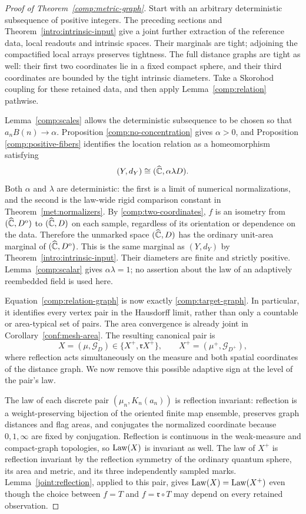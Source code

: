 \begin{proof}[Proof of Theorem~\ref{comp:metric-graph}]
Start with an arbitrary deterministic subsequence of positive
integers.  The preceding sections and
Theorem~\ref{intro:intrinsic-input} give a joint further extraction
of the reference data, local readouts and intrinsic spaces.
Their marginals are tight; adjoining the compactified local
arrays preserves tightness.  The full distance graphs are tight
as well: their first two coordinates lie in a fixed compact
sphere, and their third coordinates are bounded by the tight
intrinsic diameters.  Take a Skorohod coupling for these retained
data, and then apply Lemma~\ref{comp:relation} pathwise.

Lemma~\ref{comp:scales} allows the deterministic subsequence to
be chosen so that $a_nB(n)\to\alpha$.  Proposition
\ref{comp:no-concentration} gives $\alpha>0$, and Proposition
\ref{comp:positive-fibers} identifies the location relation as a
homeomorphism satisfying
\[
 (Y,d_Y)\cong(\widehat{\mathbb C},\alpha\lambda D).
\]
Both $\alpha$ and $\lambda$ are deterministic: the first is a
limit of numerical normalizations, and the second is the
law-wide rigid comparison constant in
Theorem~\ref{met:normalizers}.  By
\eqref{comp:two-coordinates}, $f$ is an isometry from
$(\widehat{\mathbb C},D^{\mathrm o})$ to $(\widehat{\mathbb C},D)$ on each sample, regardless
of its orientation or dependence on the data.  Therefore the
unmarked space $(\widehat{\mathbb C},D)$ has the ordinary unit-area marginal
of $(\widehat{\mathbb C},D^{\mathrm o})$.  This is the same marginal as
$(Y,d_Y)$ by Theorem~\ref{intro:intrinsic-input}.  Their diameters
are finite and strictly positive.  Lemma~\ref{comp:scalar}
gives $\alpha\lambda=1$; no assertion about the law of an
adaptively reembedded field is used here.

Equation~\eqref{comp:relation-graph} is now exactly
\eqref{comp:target-graph}.  In particular, it identifies every
vertex pair in the Hausdorff limit, rather than only a countable
or area-typical set of pairs.  The area convergence is already
joint in Corollary~\ref{conf:mesh-area}.  The resulting canonical
pair is
\[
 X=(\mu,\mathcal G_D)
   \in\{X^+,\mathfrak r X^+\},\qquad
 X^+=(\mu^+,\mathcal G_{D^+}),
\]
where reflection acts simultaneously on the measure and both
spatial coordinates of the distance graph.  We now remove this
possible adaptive sign at the level of the pair's law.

The law of each discrete pair $(\mu_n,K_n(a_n))$ is reflection
invariant: reflection is a weight-preserving bijection of the
oriented finite map ensemble, preserves graph distances and
flag areas, and conjugates the normalized coordinate because
$0,1,\infty$ are fixed by conjugation.  Reflection is continuous
in the weak-measure and compact-graph topologies, so $\operatorname{Law}(X)$
is invariant as well.  The law of $X^+$ is reflection invariant
by the reflection symmetry of the ordinary quantum sphere,
its area and metric, and its three independently sampled marks.
Lemma~\ref{joint:reflection}, applied to this pair, gives
$\operatorname{Law}(X)=\operatorname{Law}(X^+)$ even though the choice between $f=T$ and
$f=\mathfrak r\circ T$ may depend on every retained observation.


\end{proof}
